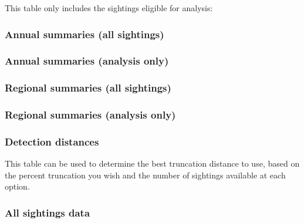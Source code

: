 \documentclass[
]{book}
\begin{document}
This table only includes the sightings eligible for analysis:

\hypertarget{annual-summaries-all-sightings}{%
\subsubsection*{Annual summaries (all sightings)}\label{annual-summaries-all-sightings}}

\hypertarget{annual-summaries-analysis-only}{%
\subsubsection*{Annual summaries (analysis only)}\label{annual-summaries-analysis-only}}

\hypertarget{regional-summaries-all-sightings}{%
\subsubsection*{Regional summaries (all sightings)}\label{regional-summaries-all-sightings}}

\hypertarget{regional-summaries-analysis-only}{%
\subsubsection*{Regional summaries (analysis only)}\label{regional-summaries-analysis-only}}

\hypertarget{detection-distances}{%
\subsubsection*{Detection distances}\label{detection-distances}}

This table can be used to determine the best truncation distance to use, based on the
percent truncation you wish and the number of sightings available at each option.

\hypertarget{all-sightings-data}{%
\subsubsection*{All sightings data}\label{all-sightings-data}}
\end{document}
